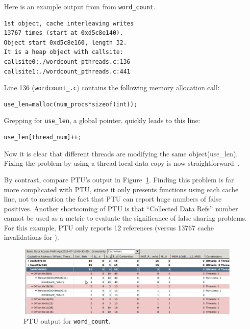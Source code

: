 Here is an example output from \sheriffdetect{} from \texttt{word\_count}.

\begin{verbatim} 
1st object, cache interleaving writes 
13767 times (start at 0xd5c8e140). 
Object start 0xd5c8e160, length 32. 
It is a heap object with callsite:
callsite0:./wordcount_pthreads.c:136
callsite1:./wordcount_pthreads.c:441
\end{verbatim}

Line 136 (\texttt{wordcount\_\pthreads{}.c}) contains the following memory allocation call:

\begin{verbatim}
use_len=malloc(num_procs*sizeof(int));
\end{verbatim}

Grepping for \texttt{use\_len}, a global pointer, quickly leads to this line:

\begin{verbatim}
use_len[thread_num]++;
\end{verbatim}

Now it is clear that different threads are modifying the same object(use\_len). Fixing the problem by using a thread-local data copy is now straightforward~\cite{detect:intel}.

By contrast, compare PTU's output in Figure~\ref{fig:wordcount}. Finding this problem is far more complicated with PTU, since it only presents functions using each cache line, not to mention the fact that PTU can report huge numbers of false positives.  Another shortcoming of PTU is that ``Collected Data Refs'' number cannot be used as a metric to evaluate the significance of false sharing problems. For this example, PTU only reports 12 references (versus 13767 cache invalidations for \sheriffdetect{}).

\begin{figure}[!t]
\centering
\includegraphics[width=6in]{sheriff/figure/wordcount}
\caption{PTU output for \texttt{word\_count}.
\label{fig:wordcount}}
\end{figure}

